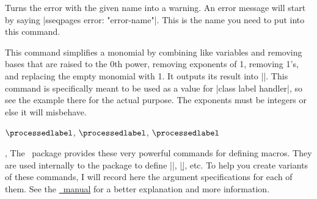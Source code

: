 \begin{sseqdata}[|| name = ex1, cohomological Serre grading]
\begin{command}{\sseqerrortowarning{}}
Turns the error with the given name into a warning. An error message will start by saying |sseqpages error: "error-name"|. This is the name you need to put into this command.
\end{command}

\begin{command}{\sseqnormalizemonomial}
This command simplifies a monomial by combining like variables and removing bases that are raised to the 0th power, removing exponents of 1, removing 1's, and replacing the empty monomial with 1. It outputs its result into |\processedlabel|. This command is specifically meant to be used as a value for |class label handler|, so see the example there for the actual purpose. The exponents must be integers or else it will misbehave.
\begin{codeexample}[]
 $\processedlabel$, \quad
{} $\processedlabel$, \quad
{} $\processedlabel$
\end{codeexample}
\end{command}

\begin{commandlist}{\NewSseqCommand    {},
                    \DeclareSseqCommand{}}
The \xparsepkg\ package provides these very powerful commands for defining macros. They are used internally to the \sseqpages\space package to define |\class|, |\d|, etc. To help you create variants of these commands, I will record here the argument specifications for each of them. See the \href{\xparseurl}{\xparsepkg\ manual} for a better explanation and more information.


\end{commandlist}
\end{sseqdata}

